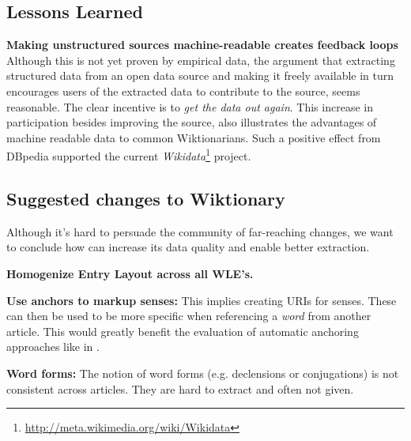 \subsection{Lessons Learned}
\textbf{Making unstructured sources machine-readable creates feedback loops}\\
Although this is not yet proven by empirical data, the argument that extracting structured data from an open data source and making it freely available in turn encourages users of the extracted data to contribute to the source, seems reasonable.
The clear incentive is to \textit{get the data out again}.
This increase in participation besides improving the source, also illustrates the advantages of machine readable data to common Wiktionarians.
Such a positive effect from DBpedia supported the current \textit{Wikidata}\footnote{\url{http://meta.wikimedia.org/wiki/Wikidata}} project.

\subsection{Suggested changes to Wiktionary}
Although it's hard to persuade the community of far-reaching changes, we want to conclude how \wik can increase its data quality and enable better extraction.
\begin{compactitem}
	\item \textbf{Homogenize Entry Layout across all WLE's.}
	\item \textbf{Use anchors to markup senses:}
		This implies creating URIs for senses.
		These can then be used to be more specific when referencing a \textit{word} from another article. 
		This would greatly benefit the evaluation of automatic anchoring approaches like in \cite{meyer_2011b}.
	\item \textbf{Word forms:}
		The notion of word forms (e.g. declensions or conjugations) is not consistent across articles.
		They are hard to extract and often not given.
\end{compactitem}


\newpage
